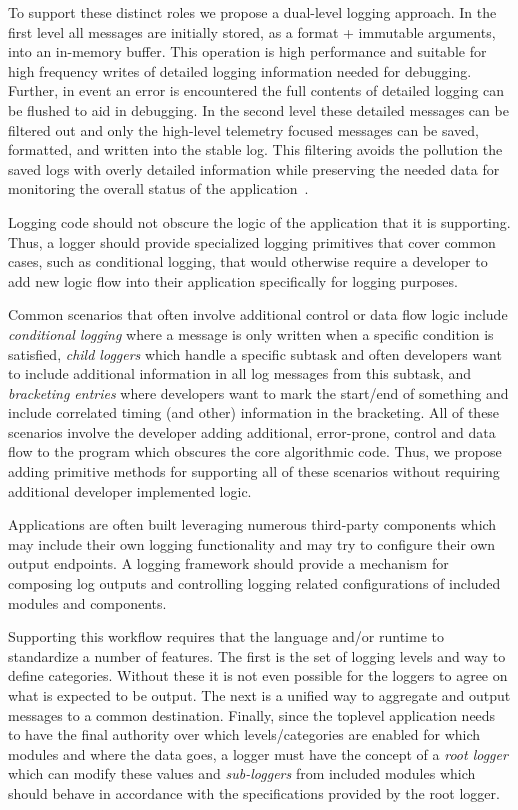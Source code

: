 To support these distinct roles we propose a dual-level logging approach. In the 
first level all messages are initially stored, as a format + immutable 
arguments, into an in-memory buffer. This operation is high performance and 
suitable for high frequency writes of detailed logging information needed for 
debugging. Further, in event an error is encountered the full contents of 
detailed logging can be flushed to aid in debugging. In the second level these 
detailed messages can be filtered out and only the high-level telemetry focused 
messages can be saved, formatted, and written into the stable log. This filtering 
avoids the pollution the saved logs with overly detailed information while 
preserving the needed data for monitoring the overall status of the application~\cite{logstudy,logstudy2}. 

\begin{design}
Logging code should not obscure the logic of the application that it is 
supporting. Thus, a logger should provide specialized logging primitives 
that cover common cases, such as conditional logging, that would otherwise 
require a developer to add new logic flow into their application specifically 
for logging purposes.
\end{design}

Common scenarios that often involve additional control or data flow logic 
include \emph{conditional logging} where a message is only written when a 
specific condition is satisfied, \emph{child loggers} which handle a specific 
subtask and often developers want to include additional information in all 
log messages from this subtask, and \emph{bracketing entries} where 
developers want to mark the start/end of something and include correlated 
timing (and other) information in the bracketing. All of these scenarios 
involve the developer adding additional, error-prone, control and data flow 
to the program which obscures the core algorithmic code. Thus, we propose 
adding primitive methods for supporting all of these scenarios without requiring 
additional developer implemented logic.

\begin{design}
Applications are often built leveraging numerous third-party components which 
may include their own logging functionality and may try to configure their own 
output endpoints. A logging framework should provide a mechanism for composing 
log outputs and controlling logging related configurations of included modules and 
components.
\end{design}

Supporting this workflow requires that the language and/or runtime to standardize 
a number of features. The first is the set of logging levels and way to define 
categories. Without these it is not even possible for the loggers to agree on 
what is expected to be output. The next is a unified way to aggregate and output 
messages to a common destination. Finally, since the toplevel application needs 
to have the final authority over which levels/categories are enabled for which 
modules and where the data goes, a logger must have the concept of a 
\emph{root logger} which can modify these values and \emph{sub-loggers}
from included modules which should behave in accordance with the 
specifications provided by the root logger.
